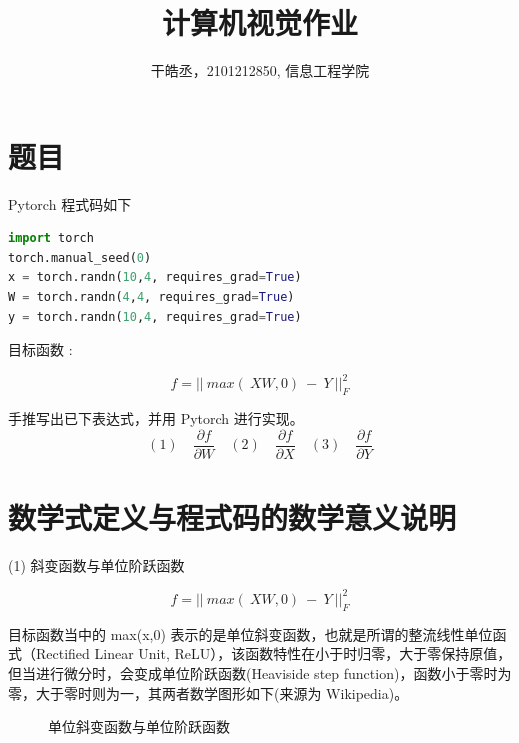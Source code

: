 \documentclass[11pt,UTF8]{ctexart}
\title{计算机视觉作业}
\author{干皓丞，2101212850, 信息工程学院}
\begin{document}
\maketitle


\section{题目}

Pytorch 程式码如下
\\
	\begin{lstlisting}[language={python}]
import torch
torch.manual_seed(0)
x = torch.randn(10,4, requires_grad=True)
W = torch.randn(4,4, requires_grad=True)
y = torch.randn(10,4, requires_grad=True)
	\end{lstlisting}


目标函数 :

$$f={||\ max(\ XW, 0)\ -\ Y\ ||}_F^2$$

手推写出已下表达式，并用 Pytorch 进行实现。
$$ (1)\quad \frac{\partial f}{\partial W}  \quad (2)\quad \frac{\partial f}{\partial X} \quad (3)\quad \frac{\partial f}{\partial Y}$$

\section{数学式定义与程式码的数学意义说明}

(1) 斜变函数与单位阶跃函数

$$f={||\ max(\ XW, 0)\ -\ Y\ ||}_F^2$$

目标函数当中的 max(x,0) 表示的是单位斜变函数，也就是所谓的整流线性单位函式（Rectified Linear Unit, ReLU），该函数特性在小于时归零，大于零保持原值，但当进行微分时，会变成单位阶跃函数(Heaviside step function)，函数小于零时为零，大于零时则为一，其两者数学图形如下(来源为 Wikipedia)。

\begin{figure}[H]
\centering  %
\caption{单位斜变函数与单位阶跃函数}
\label{Fig.main}
\end{figure}
\end{document}
